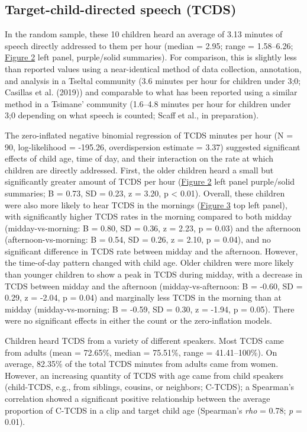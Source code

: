 \documentclass[,man,floatsintext]{apa6}
\begin{document}
\subsection{Target-child-directed speech
(TCDS)}\label{target-child-directed-speech-tcds}

In the random sample, these 10 children heard an average of 3.13 minutes
of speech directly addressed to them per hour (median = 2.95; range =
1.58--6.26; \protect\hyperlink{fig2}{Figure 2} left panel, purple/solid
summaries). For comparison, this is slightly less than reported values
using a near-identical method of data collection, annotation, and
analysis in a Tseltal community (3.6 minutes per hour for children under
3;0; Casillas et al. (2019)) and comparable to what has been reported
using a similar method in a Tsimane' community (1.6--4.8 minutes per
hour for children under 3;0 depending on what speech is counted; Scaff
et al., in preparation).

The zero-inflated negative binomial regression of TCDS minutes per hour
(N = 90, log-likelihood = -195.26, overdispersion estimate = 3.37)
suggested significant effects of child age, time of day, and their
interaction on the rate at which children are directly addressed. First,
the older children heard a small but significantly greater amount of
TCDS per hour (\protect\hyperlink{fig2}{Figure 2} left panel
purple/solid summaries; B = 0.73, SD = 0.23, z = 3.20, p \textless{}
0.01). Overall, these children were also more likely to hear TCDS in the
mornings (\protect\hyperlink{fig3}{Figure 3} top left panel), with
significantly higher TCDS rates in the morning compared to both midday
(midday-vs-morning: B = 0.80, SD = 0.36, z = 2.23, p = 0.03) and the
afternoon (afternoon-vs-morning: B = 0.54, SD = 0.26, z = 2.10, p =
0.04), and no significant difference in TCDS rate between midday and the
afternoon. However, the time-of-day pattern changed with child age.
Older children were more likely than younger children to show a peak in
TCDS during midday, with a decrease in TCDS between midday and the
afternoon (midday-vs-afternoon: B = -0.60, SD = 0.29, z = -2.04, p =
0.04) and marginally less TCDS in the morning than at midday
(midday-vs-morning: B = -0.59, SD = 0.30, z = -1.94, p = 0.05). There
were no significant effects in either the count or the zero-inflation
models.

Children heard TCDS from a variety of different speakers. Most TCDS came
from adults (mean = 72.65\%, median = 75.51\%, range = 41.41--100\%). On
average, 82.35\% of the total TCDS minutes from adults came from women.
However, an increasing quantity of TCDS with age came from child
speakers (child-TCDS, e.g., from siblings, cousins, or neighbors;
C-TCDS); a Spearman's correlation showed a significant positive
relationship between the average proportion of C-TCDS in a clip and
target child age (Spearman's \emph{rho} = 0.78; \emph{p} = 0.01).
\end{document}
